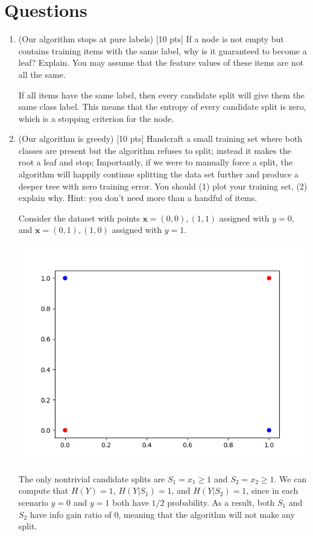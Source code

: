 \documentclass[a4paper]{article}
\theoremstyle{definition}
\def\x{\mathbf x}
\newenvironment{soln}{
    \leavevmode\color{blue}\ignorespaces
}{}
\begin{document}
\section{Questions}
\begin{enumerate}
  \item (Our algorithm stops at pure labels) [10 pts] If a node is not empty but contains training items with the same label, why is it guaranteed to become a leaf?  Explain. You may assume that the feature values of these items are not all the same. \\

        \begin{soln}
          If all items have the same label, then every candidate split will give them the same class label. This means that the entropy of every candidate split is zero, which is a stopping criterion for the node.
        \end{soln}

\item (Our algorithm is greedy)  [10 pts] Handcraft a small training set where both classes are present but the algorithm refuses to split; instead it makes the root a leaf and stop;
Importantly, if we were to manually force a split, the algorithm will happily continue splitting the data set further and produce a deeper tree with zero training error.
        You should (1) plot your training set, (2) explain why.  Hint: you don't need more than a handful of items. \\
        \begin{soln}
          Consider the dataset with points $\x=(0,0),(1,1)$ assigned with $y=0$, and $\x=(0,1),(1,0)$ assigned with $y=1$.


          \begin{center}
            \includegraphics[width=0.6\linewidth]{p2.png}
          \end{center}


          The only nontrivial candidate splits are $S_{1}=x_{1}\ge 1$ and $S_{2}=x_{2}\ge 1$. We can compute that $H(Y)=1$, $H(Y|S_{1})=1$, and $H(Y|S_{2})=1$, since in each scenario $y=0$ and $y=1$ both have $1/2$ probability. As a result, both $S_{1}$ and $S_{2}$ have info gain ratio of 0, meaning that the algorithm will not make any split.


\end{soln}
\end{enumerate}
\end{document}
